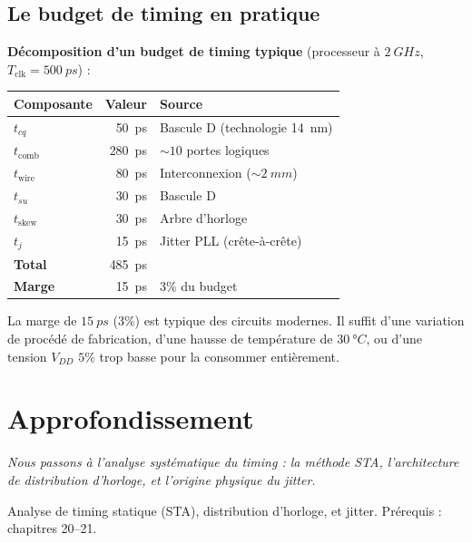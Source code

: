 \documentclass[12pt,a4paper,twoside]{book}
\begin{document}
\subsection{Le budget de timing en pratique}

\begin{pratique}
\textbf{Décomposition d'un budget de timing typique} (processeur à $\SI{2}{GHz}$, $T_{\text{clk}} = \SI{500}{ps}$) :

\begin{center}
\renewcommand{\arraystretch}{1.3}
\begin{tabular}{lrl}
\toprule
\textbf{Composante} & \textbf{Valeur} & \textbf{Source} \\
\midrule
$t_{cq}$ & \SI{50}{ps} & Bascule D (technologie \SI{14}{nm}) \\
$t_{\text{comb}}$ & \SI{280}{ps} & $\sim 10$ portes logiques \\
$t_{\text{wire}}$ & \SI{80}{ps} & Interconnexion ($\sim\SI{2}{mm}$) \\
$t_{su}$ & \SI{30}{ps} & Bascule D \\
$t_{\text{skew}}$ & \SI{30}{ps} & Arbre d'horloge \\
$t_j$ & \SI{15}{ps} & Jitter PLL (crête-à-crête) \\
\midrule
\textbf{Total} & \SI{485}{ps} & \\
\textbf{Marge} & \SI{15}{ps} & $3\%$ du budget \\
\bottomrule
\end{tabular}
\end{center}

La marge de $\SI{15}{ps}$ ($3\%$) est typique des circuits modernes. Il suffit d'une variation de procédé de fabrication, d'une hausse de température de $\SI{30}{°C}$, ou d'une tension $V_{DD}$ $5\%$ trop basse pour la consommer entièrement.
\end{pratique}

\section{Approfondissement}

\vspace{0.3cm}
\textit{Nous passons à l'analyse systématique du timing : la méthode STA, l'architecture de distribution d'horloge, et l'origine physique du jitter.}
\vspace{0.3cm}

\begin{approfondissement}
Analyse de timing statique (STA), distribution d'horloge, et jitter. Prérequis : chapitres 20--21.
\end{approfondissement}
\end{document}
